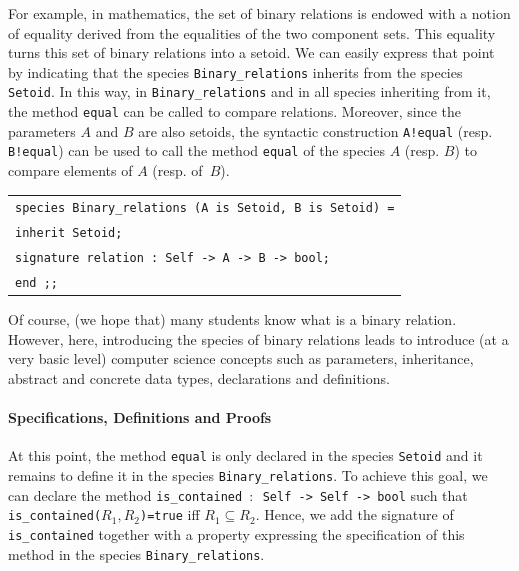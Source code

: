\documentclass[submission,copyright,creativecommons]{eptcs}
\begin{document}
For example, in mathematics,  the set of binary relations is endowed with a notion of
equality derived from the equalities of the two component sets.  This
equality turns this set of binary relations into a setoid. We can
easily express that point  by indicating that  the species {\footnotesize \tt Binary\_relations}
inherits from the species {\footnotesize \tt Setoid}. 
In this way, in
{\footnotesize \tt Binary\_relations} and in all species inheriting
from it, the method 
{\footnotesize \tt equal} can be called to compare
relations. Moreover, since the parameters $A$ and $B$ are also
setoids, the syntactic construction {\footnotesize \tt A!equal}
(resp. {\footnotesize \tt B!equal}) can be used to call the method
{\footnotesize \tt equal} of the species $A$ (resp. $B$) to compare elements of $A$ (resp. of~$B$).

\begin{center}
\begin{scriptsize}
\begin{tabular}{|l|}
\hline
{\tt species Binary\_relations (A is Setoid, B is Setoid) =} \\
{\tt inherit Setoid;} \\
{\tt signature relation : Self -> A -> B -> bool;}\\
{\tt end ;;}\\
\hline
\end{tabular}
\end{scriptsize}
\end{center}

\noindent
Of course, (we hope that) many students know what is a binary relation. However,
here, introducing the species of binary relations leads to introduce
(at a very basic level)
computer science concepts such as parameters, inheritance, abstract
and concrete data types, declarations and definitions.


\paragraph{Specifications, Definitions and Proofs}
At this point, the
method {\footnotesize \tt equal} is only declared in the species
{\footnotesize \tt Setoid}
and it remains to define it 
in the species {\footnotesize \tt Binary\_relations}. To achieve this
goal, we can declare the method {\footnotesize \tt is\_contained $\colon$ Self -> Self -> bool} 
such that
{\footnotesize \tt is\_contained($R_1,R_2$)=true} iff $R_1 \subseteq
R_2$. Hence, we add the signature of {\footnotesize \tt is\_contained} together with a property 
expressing the specification
of this method in the species {\footnotesize \tt Binary\_relations}.
\end{document}
